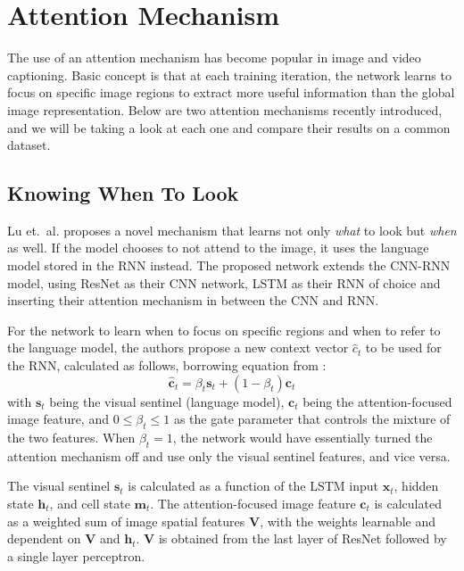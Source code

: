 \documentclass[10pt,twocolumn,letterpaper]{article}
\begin{document}
\section{Attention Mechanism}

The use of an attention mechanism has become popular in image and video
captioning. Basic concept is that at each training iteration, the network
learns to focus on specific image regions to extract more useful information
than the global image representation. Below are two attention mechanisms
recently introduced, and we will be taking a look at each one and compare
their results on a common dataset.

\subsection{Knowing When To Look}
Lu et.\ al.\cite{attentionwhen} proposes a novel mechanism that learns not only
\textit{what} to look but \textit{when} as well. If the model chooses to not
attend to the image, it uses the language model stored in the RNN instead.
The proposed network extends the CNN-RNN model, using ResNet \cite{resnet} as
their CNN network, LSTM as their RNN of choice and inserting their attention
mechanism in between the CNN and RNN.

For the network to learn when to focus on specific regions and when to refer
to the language model, the authors propose a new context vector $\hat{c}_t$ to
be used for the RNN, calculated as follows, borrowing equation from
\cite{attentionwhen}:
%
\begin{equation}
  \hat{\bm{c}}_t = \beta_t \bm{s}_t + (1 - \beta_t) \bm{c}_t
\end{equation}
%
with $\bm{s}_t$ being the visual sentinel (language model), $\bm{c}_t$ being
the attention-focused image feature, and $0 \le \beta_t \le 1$ as the gate
parameter that controls the mixture of the two features. When $\beta_t=1$, the
network would have essentially turned the attention mechanism off and use only
the visual sentinel features, and vice versa.

The visual sentinel $\bm{s}_t$ is calculated as a function of the LSTM input
$\bm{x}_t$, hidden state $\bm{h}_t$, and cell state $\bm{m}_t$. The
attention-focused image feature $\bm{c}_t$ is calculated as a weighted sum of
image spatial features $\bm{V}$, with the weights learnable and dependent on
$\bm{V}$ and $\bm{h}_t$. $\bm{V}$ is obtained from the last layer of ResNet
\cite{resnet} followed by a single layer perceptron.
\end{document}
